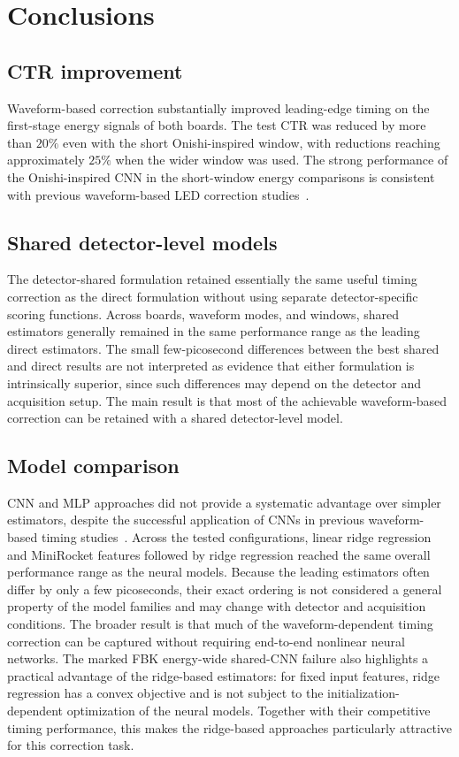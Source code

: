 \section{Conclusions}
\subsection{CTR improvement}
Waveform-based correction substantially improved leading-edge 
timing on the first-stage energy signals of both boards. 
The test CTR was reduced by more than $20\%$ 
even with the short Onishi-inspired window, with reductions 
reaching approximately $25\%$ when the wider window was used. 
The strong performance of the
Onishi-inspired CNN in the short-window energy comparisons is
consistent with previous waveform-based LED correction
studies~\cite{onishi2022,loignon2025}.

\subsection{Shared detector-level models}
The detector-shared formulation retained essentially the same useful
timing correction as the direct formulation without using separate
detector-specific scoring functions. Across boards, waveform modes,
and windows, shared estimators generally remained in the same
performance range as the leading direct estimators. The small
few-picosecond differences between the best shared and direct results
are not interpreted as evidence that either formulation is intrinsically
superior, since such differences may depend on the detector and
acquisition setup. The main result is that most of the achievable
waveform-based correction can be retained with a shared detector-level
model.

\subsection{Model comparison}
CNN and MLP approaches did not provide a systematic advantage over
simpler estimators, despite the successful application of CNNs in
previous waveform-based timing studies~\cite{onishi2022,loignon2025}.
Across the tested configurations, linear ridge regression and
MiniRocket features followed by ridge regression reached the same
overall performance range as the neural models. Because the leading
estimators often differ by only a few picoseconds, their exact ordering
is not considered a general property of the model families and may
change with detector and acquisition conditions. The broader result is
that much of the waveform-dependent timing correction can be captured
without requiring end-to-end nonlinear neural networks. The marked FBK
energy-wide shared-CNN failure also highlights a practical advantage of
the ridge-based estimators: for fixed input features, ridge regression
has a convex objective and is not subject to the initialization-dependent
optimization of the neural models. Together with their competitive
timing performance, this makes the ridge-based approaches particularly
attractive for this correction task.

